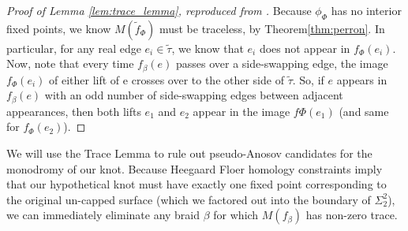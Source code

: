 \begin{proof}[Proof of Lemma \ref{lem:trace_lemma}, reproduced from \cite{reinoso2024pseudo}]
Because $\phi_\Phi$ has no interior fixed points, we know $M(\tilde{f}_\Phi)$ must be traceless, by Theorem\ref{thm:perron}. In particular, for any real edge $e_i \in \tilde{\tau}$, we know that $e_i$ does not
appear in $f_\Phi (e_i )$. Now, note that every time $f_\beta (e)$ passes over a side-swapping edge, the image $f_\Phi (e_i )$ of either lift of e crosses over to the other side of $\tilde{\tau}$. So, if $e$ appears in $f_\beta (e)$ with an
odd number of side-swapping edges between adjacent appearances, then both lifts $e_1$
and $e_2$ appear in the image $f\Phi (e_1 )$ (and same for $f_\Phi (e_2 )$).
\end{proof}

We will use the Trace Lemma to rule out pseudo-Anosov candidates for the monodromy of our knot. Because Heegaard Floer homology constraints imply that our hypothetical knot must have exactly one fixed point corresponding to the original un-capped surface (which we factored out into the boundary of $\Sigma_2^2$), we can immediately eliminate any braid $\beta$ for which $M(f_\beta)$ has non-zero trace.